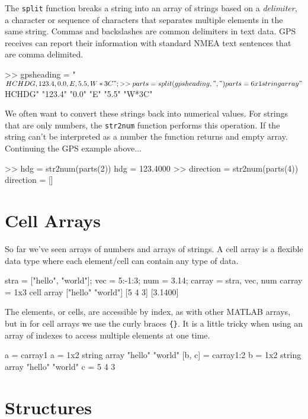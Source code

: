 The \lstinline{split} function breaks a string into an array of strings based on a \emph{delimiter}, a character or sequence of characters that separates multiple elements in the same string.  Commas and backslashes are common delimiters in text data.  GPS receives can report their information with standard NMEA text sentences that are comma delimited.  

\begin{code}
>> gpsheading = "$HCHDG,123.4,0.0,E,5.5,W*3C";
>> parts = split(gpsheading, ",")
parts = 
  6x1 string array
    "$HCHDG"
    "123.4"
    "0.0"
    "E"
    "5.5"
    "W*3C"
\end{code}

We often want to convert these strings back into numerical values.  For strings that are only numbers, the \lstinline{str2num} function performs this operation.   If the string can't be interpreted as a number the function returns and empty array.  Continuing the GPS example above...
\begin{code}
>> hdg = str2num(parts(2))
    hdg =
      123.4000
>> direction = str2num(parts(4))
    direction =
         [] 
\end{code}

\section{Cell Arrays}

So far we've seen arrays of numbers and arrays of strings.  A cell array is a flexible data type where each element/cell can contain any type of data.
\begin{code}
    stra = ["hello", "world"];
vec = 5:-1:3;
num = 3.14;
carray = {stra, vec, num}
carray =
  1x3 cell array
    {["hello"    "world"]}    {[5 4 3]}    {[3.1400]}
\end{code}

The elements, or cells, are accessible by index, as with other MATLAB arrays, but in for cell arrays we use the curly braces \lstinline|{}|.  It is a little tricky when using an array of indexes to access multiple elements at one time.
\begin{code}
    a = carray{1}
    a = 
      1x2 string array
        "hello"    "world"
    [b, c]  = carray{1:2}
    b = 
      1x2 string array
        "hello"    "world"
    c =
         5     4     3

\end{code}

\section{Structures}

